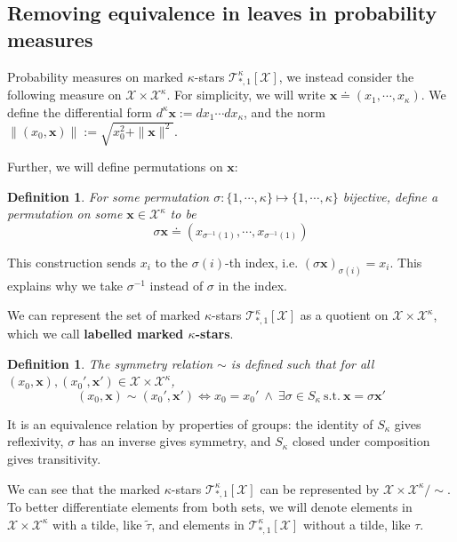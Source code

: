 \documentclass[12pt]{article}
\newtheorem{definition}[theorem]{Definition}
\numberwithin{equation}{section}
\begin{document}
\subsection{Removing equivalence in leaves in probability measures}

Probability measures on marked $\kappa$-stars $\mathcal{T}^\kappa_{*, 1}[\mathcal{X}]$, we instead consider the following measure on $\mathcal{X} \times \mathcal{X}^\kappa$.
For simplicity, we will write $\mathbf{x}\doteq(x_1, \cdots, x_\kappa)$.
We define the differential form $d^{\kappa}\mathbf{x} := dx_1\cdots dx_\kappa$, and
the norm $\|(x_0, \mathbf{x})\| := \sqrt{x_0^2 + \|\mathbf{x}\|^2}$.

Further, we will define permutations on $\mathbf{x}$:
\begin{definition}
    For some permutation $\sigma: \{1, \cdots, \kappa\} \mapsto \{1, \cdots, \kappa\}$ bijective, define a permutation on
    some $\mathbf{x}\in \mathcal{X}^\kappa$ to be
    \begin{equation*}
        \sigma\mathbf{x} \doteq (x_{\sigma^{-1}(1)}, \cdots, x_{\sigma^{-1}(1)})
    \end{equation*}
\end{definition}

This construction sends $x_i$ to the $\sigma(i)$-th index, i.e. $(\sigma\mathbf{x})_{\sigma(i)} = x_i$. This explains why
we take $\sigma^{-1}$ instead of $\sigma$ in the index.

We can represent the set of marked $\kappa$-stars $\mathcal{T}^\kappa_{*, 1}[\mathcal{X}]$ as a quotient on $\mathcal{X}\times\mathcal{X}^\kappa$,
which we call \textbf{labelled marked $\kappa$-stars}.
\begin{definition}
    The symmetry relation $\sim$ is defined such that for all $(x_0, \mathbf{x}), (x_0', \mathbf{x}')\in \mathcal{X}\times\mathcal{X}^\kappa$,
    \begin{equation*}
        (x_0, \mathbf{x})\sim (x_0', \mathbf{x}') \iff x_0 = x_0'\ \wedge\ \exists \sigma\in S_\kappa\ \text{s.t.}\ \mathbf{x} = \sigma\mathbf{x}'
    \end{equation*}
\end{definition}

It is an equivalence relation by properties of groups: the identity of $S_\kappa$ gives reflexivity, $\sigma$ has an inverse gives symmetry,
and $S_\kappa$ closed under composition gives transitivity.

We can see that the marked $\kappa$-stars $\mathcal{T}^\kappa_{*, 1}[\mathcal{X}]$ can be represented by $\mathcal{X}\times\mathcal{X}^\kappa / \sim$.
To better differentiate elements from both sets, we will denote elements in $\mathcal{X}\times\mathcal{X}^\kappa$ with a tilde, like $\widetilde{\tau}$, and elements in $\mathcal{T}^\kappa_{*, 1}[\mathcal{X}]$ without a tilde, like $\tau$.
\end{document}
